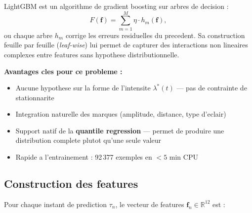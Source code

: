 \documentclass[a4paper,11pt]{article}
\begin{document}
LightGBM est un algorithme de gradient boosting sur arbres de decision :
\[
F(\mathbf{f}) = \sum_{m=1}^{M} \eta \cdot h_m(\mathbf{f}),
\]
ou chaque arbre $h_m$ corrige les erreurs residuelles du precedent. Sa
construction feuille par feuille (\emph{leaf-wise}) lui permet de capturer des
interactions non lineaires complexes entre features sans hypothese
distributionnelle.

\textbf{Avantages cles pour ce probleme :}
\begin{itemize}
  \item Aucune hypothese sur la forme de l'intensite $\lambda^*(t)$ --- pas de
        contrainte de stationnarite
  \item Integration naturelle des marques (amplitude, distance, type d'eclair)
  \item Support natif de la \textbf{quantile regression} --- permet de produire
        une distribution complete plutot qu'une seule valeur
  \item Rapide a l'entrainement : 92\,377 exemples en $< 5$ min CPU
\end{itemize}

\subsection{Construction des features}

Pour chaque instant de prediction $\tau_n$, le vecteur de features
$\mathbf{f}_n \in \mathbb{R}^{12}$ est :
\end{document}

